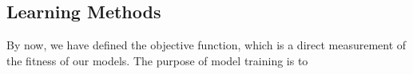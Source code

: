 \subsection {Learning Methods}
By now, we have defined the objective function, which is a direct measurement of the fitness of our models. The purpose of model training is to 